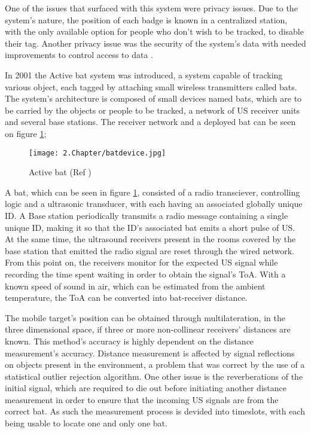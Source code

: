 One of the issues that surfaced with this system were privacy issues. Due to the system's nature, the position of each badge is known in a centralized station, with the only available option for people who don't wish to be tracked, to disable their tag. Another privacy issue was the security of the system's data with needed improvements to control access to data \cite{badge1}.







\label{subsec:bat}


In 2001 the Active bat system \cite{bat}was introduced, a system capable of tracking various object, each tagged by attaching small wireless transmitters called bats. The system's architecture is composed of small devices named bats, which are to be carried by the objects or people to be tracked, a network of \acf{US} receiver units and several base stations. The receiver network and a deployed bat can be seen on figure \ref{fig:bat};

\begin{figure}[H]
	\centering
		\texttt{[image: 2.Chapter/batdevice.jpg]}
	\caption[Active bat (Ref \cite{batfig}) ]{Active bat (Ref \cite{batfig}) }
	\label{fig:bat}
\end{figure}

 A bat, which can be seen in figure \ref{fig:bat}, consisted of a radio transciever, controlling logic and a ultrasonic transducer, with each having an associated globally unique ID. A Base station periodically transmits a radio message containing a single unique ID, making it so that the ID's associated bat emits a short pulse of \ac{US}. At the same time, the ultrasound receivers present in the rooms covered by the base station that emitted the radio signal are reset through the wired network. From this point on, the receivers monitor for the expected \ac{US} signal while recording the time spent waiting in order to obtain the signal's \ac{ToA}. With a known speed of sound in air, which can be estimated from the ambient temperature, the \ac{ToA} can be converted into bat-receiver distance.

 The mobile target's position can be obtained through multilateration, in the three dimensional space, if three or more non-collinear receivers' distances are known. This method's accuracy is highly dependent on the distance measurement's accuracy. Distance measurement is affected by signal reflections on objects present in the environment, a problem that was correct by the use of a statistical outlier rejection algorithm. One other issue is the reverberations of the initial signal, which are required to die out before initiating another distance measurement in order to ensure that the incoming \ac{US} signals are from the correct bat. As such the measurement process is devided into timeslots, with each being usable to locate one and only one bat.

